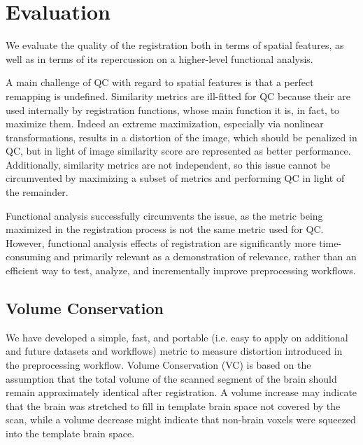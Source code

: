 \section{Evaluation}

We evaluate the quality of the registration both in terms of spatial features, as well as in terms of its repercussion on a higher-level functional analysis.

A main challenge of QC with regard to spatial features is that a perfect remapping is undefined.
Similarity metrics are ill-fitted for QC because their are used internally by registration functions, whose main function it is, in fact, to maximize them.
Indeed an extreme maximization, especially via nonlinear transformations, results in a distortion of the image, which should be penalized in QC, but in light of image similarity score are represented as better performance.
Additionally, similarity metrics are not independent, so this issue cannot be circumvented by maximizing a subset of metrics and performing QC in light of the remainder.

Functional analysis successfully circumvents the issue, as the metric being maximized in the registration process is not the same metric used for QC.
However, functional analysis effects of registration are significantly more time-consuming and primarily relevant as a demonstration of relevance, rather than an efficient way to test, analyze, and incrementally improve preprocessing workflows.

\subsection{Volume Conservation}

We have developed a simple, fast, and portable (i.e. easy to apply on additional and future datasets and workflows) metric to measure distortion introduced in the preprocessing workflow.
Volume Conservation (VC) is based on the assumption that the total volume of the scanned segment of the brain should remain approximately identical after registration.
A volume increase may indicate that the brain was stretched to fill in template brain space not covered by the scan, while a volume decrease might indicate that non-brain voxels were squeezed into the template brain space.

